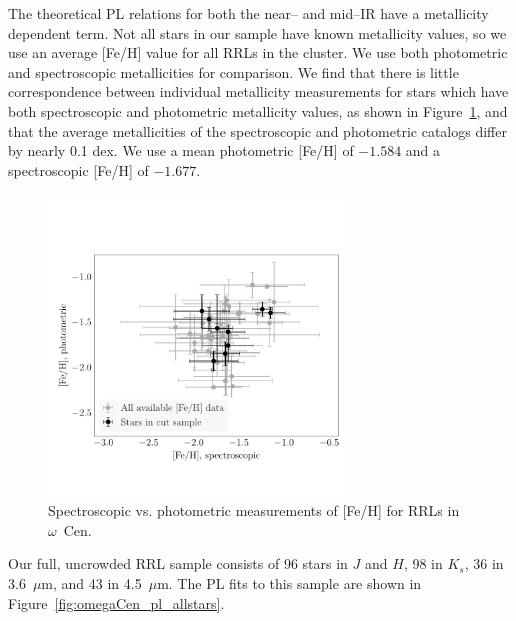 \documentclass[a4paper,fleqn,usenatbib]{mnras}
\begin{document}

The theoretical PL relations for both the near-- and mid--IR have a metallicity dependent term. 
Not all stars in our sample have known metallicity values, so we use an average [Fe/H] value for all RRLs in the cluster. We use both photometric \citep{2000AJ....119.1824R} and spectroscopic \citep{2006ApJ...640L..43S} metallicities for comparison. We find that there is little correspondence between individual metallicity measurements for stars which have both spectroscopic and photometric metallicity values, as shown in Figure~\ref{fig:metallicity_comparison}, and that the average metallicities of the spectroscopic and photometric catalogs differ by nearly 0.1 dex. We use a mean photometric [Fe/H] of  $-1.584$ and a spectroscopic [Fe/H] of $-1.677$.

\begin{figure}
\begin{center}
\includegraphics[width=80mm]{final_plots/metallicity_comparison_all.pdf}
\caption{Spectroscopic vs. photometric measurements of [Fe/H] for RRLs in $\omega$~Cen.}
\label{fig:metallicity_comparison}
\end{center}
\end{figure}



Our full, uncrowded RRL sample consists of 96 stars in $J$ and $H$, 98 in $K_s$, 36 in 3.6~$\mu$m, and 43 in 4.5~$\mu$m. The PL fits to this sample are shown in Figure~\ref{fig:omegaCen_pl_allstars}.
\end{document}
